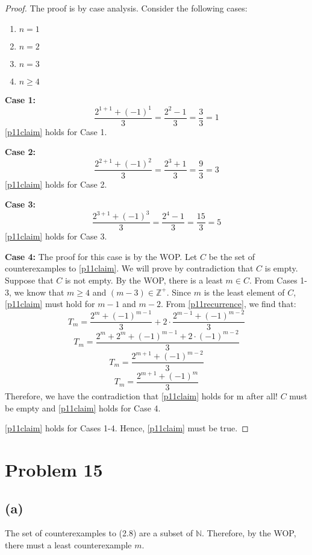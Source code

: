 \documentclass{article}
\begin{document}
\begin{proof}
	The proof is by case analysis. Consider the following cases:
	\begin{enumerate}
		\item $n = 1$
		\item $n = 2$
		\item $n = 3$
		\item $n \ge 4$
	\end{enumerate}

	\textbf{Case 1:}
	\[
		\frac{2^{1 + 1} + (-1)^1}{3} = \frac{2^2 - 1}{3} = \frac{3}{3} = 1
	\]
	\eqref{p11claim} holds for Case 1.

	\textbf{Case 2:}
	\[
		\frac{2^{2 + 1} + (-1)^2}{3} = \frac{2^3 + 1}{3} = \frac{9}{3} = 3
	\]
	\eqref{p11claim} holds for Case 2.

	\textbf{Case 3:}
	\[
		\frac{2^{3 + 1} + (-1)^3}{3} = \frac{2^4 - 1}{3} = \frac{15}{3} = 5
	\]
	\eqref{p11claim} holds for Case 3.

	\textbf{Case 4:}
	The proof for this case is by the WOP. Let $C$ be the set of counterexamples to \eqref{p11claim}. We will prove by contradiction that $C$ is empty. Suppose that $C$ is not empty. By the WOP, there is a least $m \in C$. From Cases 1-3, we know that $m \geq 4$ and $(m - 3) \in \mathbb{Z^+}$. Since $m$ is the least element of $C$, \eqref{p11claim} must hold for $m - 1$ and $m - 2$. From \eqref{p11recurrence}, we find that:
	\[
		T_m = \frac{2^m + (-1)^{m - 1}}{3} + 2 \cdot \frac{2^{m-1} + (-1)^{m-2}}{3}
	\]
	\[
		T_m = \frac{2^m + 2^m + (-1)^{m - 1} + 2 \cdot (-1)^{m-2}}{3}
	\]
	\[
		T_m = \frac{2^{m + 1} + (-1)^{m - 2}}{3}
	\]
	\[
		T_m = \frac{2^{m + 1} + (-1)^m}{3}
	\]
	Therefore, we have the contradiction that \eqref{p11claim} holds for m after all! $C$ must be empty and \eqref{p11claim} holds for Case 4.

	\eqref{p11claim} holds for Cases 1-4. Hence, \eqref{p11claim} must be true.

\end{proof}

\pagebreak

\section{Problem 15}
\subsection{(a)}
The set of counterexamples to (2.8) are a subset of $\mathbb{N}$. Therefore, by the WOP, there must a least counterexample $m$.
\end{document}

